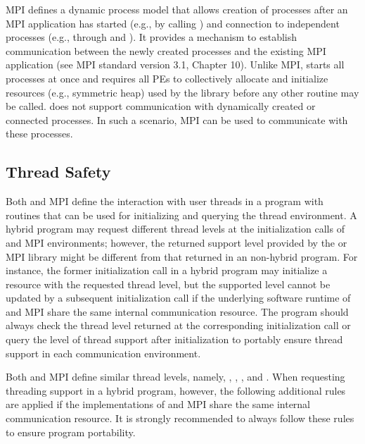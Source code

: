 \ac{MPI} defines a dynamic process model that allows creation of processes after
an \ac{MPI} application has started (e.g., by calling ) and
connection to independent processes (e.g., through 
and ).
It provides a mechanism to establish communication
between the newly created processes and the existing \ac{MPI} application (see
\ac{MPI} standard version 3.1, Chapter 10).
Unlike \ac{MPI}, \openshmem starts all processes at once and requires all \acp{PE} to
collectively allocate and initialize resources (e.g., symmetric heap) used by
the \openshmem library before any other \openshmem routine may
be called. \openshmem does not support communication with dynamically created
or connected processes. In such a scenario, \ac{MPI} can be used to communicate
with these processes.


\subsection{Thread Safety}
\label{subsec:interoperability:thread}
Both \openshmem and \ac{MPI} define the interaction with user threads in a program
with routines that can be used for initializing and querying the thread
environment. A hybrid program may request different thread levels
at the initialization calls of \openshmem and \ac{MPI} environments; however, the
returned support level provided by the \openshmem or \ac{MPI} library might be different
from that returned in an non-hybrid program. For instance, the former
initialization call in a hybrid program may initialize a resource with the
requested thread level, but the supported level cannot be updated by a subsequent
initialization call if the underlying software runtime of \openshmem and \ac{MPI}
share the same internal communication resource.
The program should always check the  thread level returned
at the corresponding initialization call or query the level of thread support
after initialization to portably ensure thread support in each communication
environment.

Both \openshmem and \ac{MPI} define similar thread levels, namely, ,
, , and .
When requesting threading support in a hybrid program, however,
the following additional rules are applied if the implementations of \openshmem
and \ac{MPI} share the same internal communication resource.
It is strongly recommended to always follow these rules to ensure program
portability.

